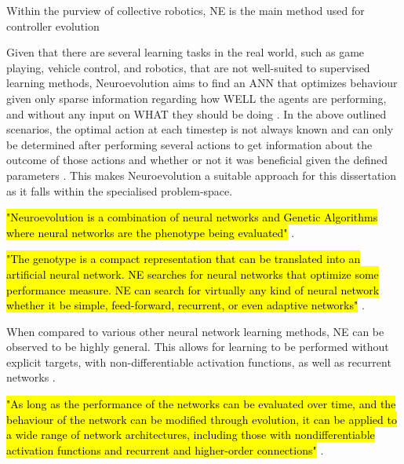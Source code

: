 
Within the purview of collective robotics, NE is the main method used for controller evolution


Given that there are several learning tasks in the real world, such as game playing, vehicle control, and robotics, that are not well-suited to supervised learning methods, Neuroevolution aims to find an ANN that optimizes behaviour given only sparse information regarding how WELL the agents are performing, and without any input on WHAT they should be doing \cite{Miikkulainen2010}. 
In the above outlined scenarios, the optimal action at each timestep is not always known and can only be determined after performing several actions to get information about the outcome of those actions and whether or not it was beneficial given the defined parameters \cite{Miikkulainen2010}.
This makes Neuroevolution a suitable approach for this dissertation as it falls within the specialised problem-space.

\hl{"Neuroevolution is a combination of neural networks and Genetic Algorithms where neural networks are the phenotype being evaluated"} \cite{Stanley2004}.

\hl{"The genotype is a compact representation that can be translated into an artificial neural network. NE searches for neural networks that optimize some performance measure. NE can search for virtually any kind of neural network whether it be simple, feed-forward, recurrent, or even adaptive networks"} \cite{Stanley2004}.

When compared to various other neural network learning methods, NE can be observed to be highly general. This allows for learning to be performed without explicit targets, with non-differentiable activation functions, as well as recurrent networks \cite{Miikkulainen2010}.

\hl{"As long as the performance of the networks can be evaluated over time, and the behaviour of the network can be modified through evolution, it can be applied to a wide range of network architectures, including those with nondifferentiable activation functions and recurrent and higher-order connections"} \cite{Miikkulainen2010}.



